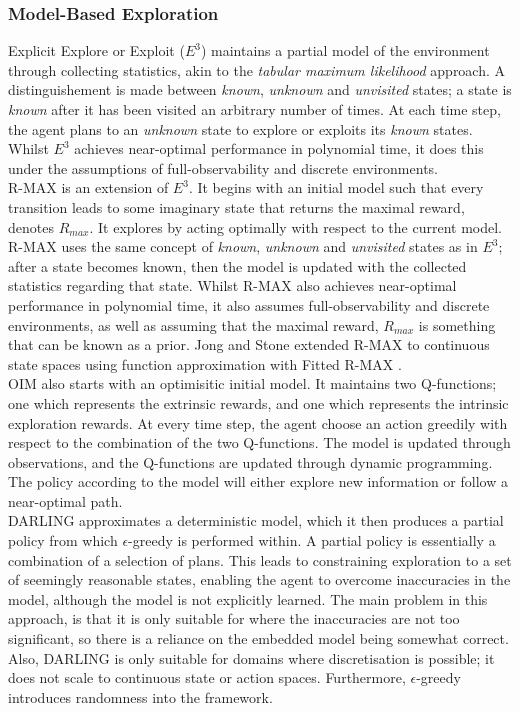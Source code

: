 \subsubsection{Model-Based Exploration}
Explicit Explore or Exploit ($E^3$) \cite{Kearns+Singh:2002} maintains a partial model of the environment through collecting statistics, akin to the \textit{tabular maximum likelihood} approach. A distinguishement is made between \textit{known}, \textit{unknown} and \textit{unvisited} states; a state is \textit{known} after it has been visited an arbitrary number of times. At each time step, the agent plans to an \textit{unknown} state to explore or exploits its \textit{known} states. Whilst $E^3$ achieves near-optimal performance in polynomial time, it does this under the assumptions of full-observability and discrete environments.
\\ R-MAX \cite{10.1162/153244303765208377} is an extension of $E^3$. It begins with an initial model such that every transition leads to some imaginary state that returns the maximal reward, denotes $R_{max}$. It explores by acting optimally with respect to the current model. R-MAX uses the same concept of  \textit{known}, \textit{unknown} and \textit{unvisited} states as in $E^3$; after a state becomes known, then the model is updated with the collected statistics regarding that state. Whilst R-MAX also achieves near-optimal performance in polynomial time, it also assumes full-observability and discrete environments, as well as assuming that the maximal reward, $R_{max}$ is something that can be known as a prior. Jong and Stone extended R-MAX to continuous state spaces using function approximation with Fitted R-MAX \cite{SARA07-jong}.
\\ OIM \cite{10.1145/1390156.1390288} also starts with an optimisitic initial model. It maintains two Q-functions; one which represents the extrinsic rewards, and one which represents the intrinsic exploration rewards. At every time step, the agent choose an action greedily with respect to the combination of the two Q-functions. The model is updated through observations, and the Q-functions are updated through dynamic programming. The policy according to the model will either explore new information or follow a near-optimal path.
\\DARLING \cite{AIJ16-leonetti} approximates a deterministic model, which it then produces a partial policy from which $\epsilon$-greedy is performed within. A partial policy is essentially a combination of a selection of plans.  This leads to constraining exploration to a set of seemingly reasonable states, enabling the agent to overcome inaccuracies in the model, although the model is not explicitly learned. The main problem in this approach, is that it is only suitable for where the inaccuracies are not too significant, so there is a reliance on the embedded model being somewhat correct. Also, DARLING is only suitable for domains where discretisation is possible; it does not scale to continuous state or action spaces. Furthermore, $\epsilon$-greedy introduces randomness into the framework.
